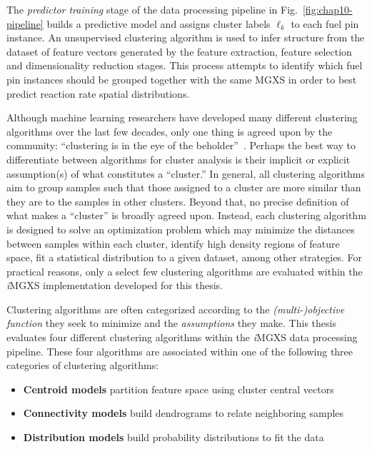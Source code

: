 The \textit{predictor training} stage of the data processing pipeline in Fig.~\ref{fig:chap10-pipeline} builds a predictive model and assigns cluster labels $\ell_{k}$ to each fuel pin instance. An unsupervised clustering algorithm is used to infer structure from the dataset of feature vectors generated by the feature extraction, feature selection and dimensionality reduction stages. This process attempts to identify which fuel pin instances should be grouped together with the same \ac{MGXS} in order to best predict reaction rate spatial distributions.


Although machine learning researchers have developed many different clustering algorithms over the last few decades, only one thing is agreed upon by the community: ``clustering is in the eye of the beholder''~\cite{castro2002clustering}. Perhaps the best way to differentiate between algorithms for cluster analysis is their implicit or explicit assumption(s) of what constitutes a ``cluster.'' In general, all clustering algorithms aim to group samples such that those assigned to a cluster are more similar than they are to the samples in other clusters. Beyond that, no precise definition of what makes a ``cluster'' is broadly agreed upon. Instead, each clustering algorithm is designed to solve an optimization problem which may minimize the distances between samples within each cluster, identify high density regions of feature space, fit a statistical distribution to a given dataset, among other strategies. For practical reasons, only a select few clustering algorithms are evaluated within the \textit{i}\ac{MGXS} implementation developed for this thesis.

Clustering algorithms are often categorized according to the \textit{(multi-)objective function} they seek to minimize and the \textit{assumptions} they make. This thesis evaluates four different clustering algorithms within the \textit{i}\ac{MGXS} data processing pipeline. These four algorithms are associated within one of the following three categories of clustering algorithms:
 
\begin{itemize}[noitemsep]
\item \textbf{Centroid models} partition feature space using cluster central vectors
\item \textbf{Connectivity models} build dendrograms to relate neighboring samples
\item \textbf{Distribution models} build probability distributions to fit the data
\end{itemize}


